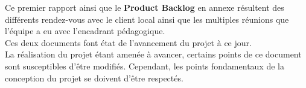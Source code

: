 Ce premier rapport ainsi que le \textbf{Product Backlog} en annexe résultent des différents rendez-vous avec le client local ainsi que les multiples réunions que l'équipe a eu avec l'encadrant pédagogique.\\
Ces deux documents font état de l'avancement du projet à ce jour.\\

La réalisation du projet étant amenée à avancer, certains points de ce document sont susceptibles d'être modifiés. Cependant, les points fondamentaux de la conception du projet se doivent d'être respectés.\\



